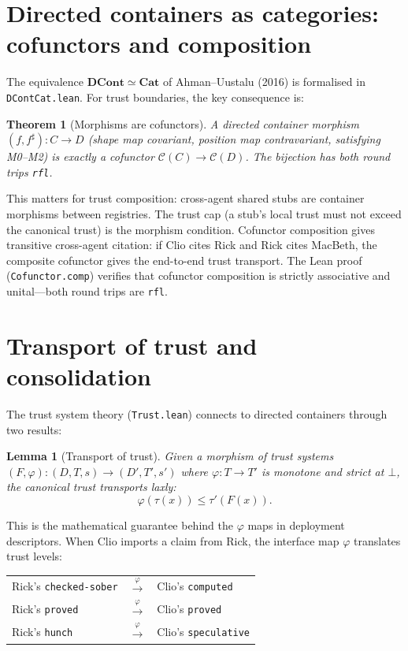 \documentclass[11pt,a4paper]{article}
\theoremstyle{definition}
\theoremstyle{plain}
\newtheorem{theorem}[definition]{Theorem}
\newtheorem{lemma}[definition]{Lemma}
\theoremstyle{remark}
\newcommand{\DCont}{\mathbf{DCont}}
\newcommand{\Cat}{\mathbf{Cat}}
\begin{document}
\section{Directed containers as categories: cofunctors and composition}

The equivalence $\DCont \simeq \Cat$ of Ahman--Uustalu (2016) is
formalised in \texttt{DContCat.lean}. For trust boundaries, the key
consequence is:

\begin{theorem}[Morphisms are cofunctors]
A directed container morphism $(f, f^\sharp) : C \to D$ (shape map
covariant, position map contravariant, satisfying M0--M2) is exactly a
cofunctor $\mathcal{C}(C) \to \mathcal{C}(D)$. The bijection has both
round trips \texttt{rfl}.
\end{theorem}

This matters for trust composition: cross-agent shared stubs are
container morphisms between registries. The trust cap (a stub's local
trust must not exceed the canonical trust) is the morphism condition.
Cofunctor composition gives transitive cross-agent citation: if Clio
cites Rick and Rick cites MacBeth, the composite cofunctor gives the
end-to-end trust transport. The Lean proof (\texttt{Cofunctor.comp})
verifies that cofunctor composition is strictly associative and
unital---both round trips are \texttt{rfl}.

\section{Transport of trust and consolidation}

The trust system theory (\texttt{Trust.lean}) connects to directed
containers through two results:

\begin{lemma}[Transport of trust]
Given a morphism of trust systems
$(F, \varphi) : (D, T, s) \to (D', T', s')$ where $\varphi : T \to T'$
is monotone and strict at $\bot$, the canonical trust transports laxly:
\[
  \varphi(\tau(x)) \le \tau'(F(x)).
\]
\end{lemma}

This is the mathematical guarantee behind the $\varphi$ maps in
deployment descriptors. When Clio imports a claim from Rick, the
interface map $\varphi$ translates trust levels:

\begin{center}
\begin{tabular}{lcl}
Rick's \texttt{checked-sober} & $\xrightarrow{\varphi}$ & Clio's \texttt{computed} \\
Rick's \texttt{proved} & $\xrightarrow{\varphi}$ & Clio's \texttt{proved} \\
Rick's \texttt{hunch} & $\xrightarrow{\varphi}$ & Clio's \texttt{speculative} \\
\end{tabular}
\end{center}
\end{document}
